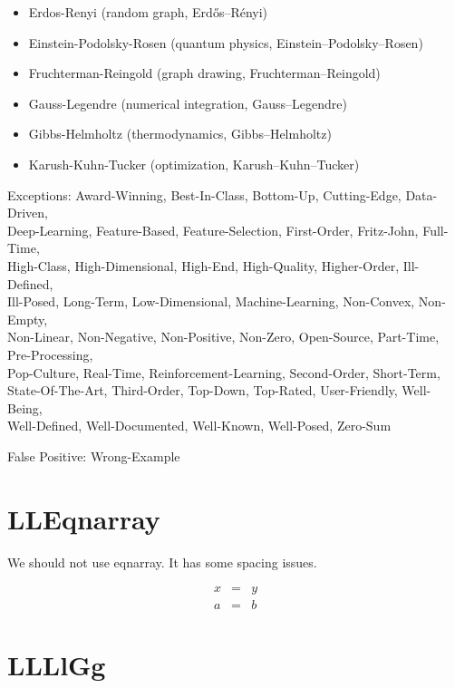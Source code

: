 \documentclass[a4paper]{article}
\begin{document}
\begin{itemize}
	\item Erdos-Renyi (random graph, Erd\H{o}s--R\'enyi)
	\item Einstein-Podolsky-Rosen (quantum physics, Einstein--Podolsky--Rosen)
	\item Fruchterman-Reingold (graph drawing, Fruchterman--Reingold)
	\item Gauss-Legendre (numerical integration, Gauss--Legendre)
	\item Gibbs-Helmholtz (thermodynamics, Gibbs--Helmholtz)
	\item Karush-Kuhn-Tucker (optimization, Karush--Kuhn--Tucker)
\end{itemize}

Exceptions: Award-Winning, Best-In-Class, Bottom-Up, Cutting-Edge, Data-Driven,\\
Deep-Learning, Feature-Based, Feature-Selection, First-Order, Fritz-John, Full-Time,\\
High-Class, High-Dimensional, High-End, High-Quality, Higher-Order, Ill-Defined,\\
Ill-Posed, Long-Term, Low-Dimensional, Machine-Learning, Non-Convex, Non-Empty,\\
Non-Linear, Non-Negative, Non-Positive, Non-Zero, Open-Source, Part-Time, Pre-Processing, \\
Pop-Culture, Real-Time, Reinforcement-Learning, Second-Order, Short-Term,\\
State-Of-The-Art, Third-Order, Top-Down, Top-Rated, User-Friendly, Well-Being,\\
Well-Defined, Well-Documented, Well-Known, Well-Posed, Zero-Sum


\vspace{\baselineskip}

False Positive: Wrong-Example

\section{LLEqnarray}

We should not use eqnarray. It has some spacing issues.

\begin{eqnarray*}
	x & = & y \\
	a & = & b
\end{eqnarray*}

\section{LLLlGg}
\end{document}
